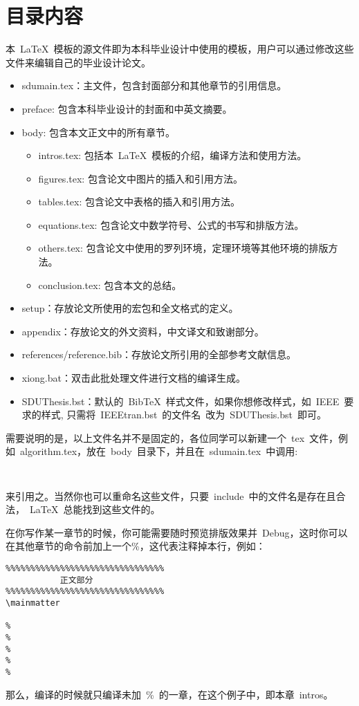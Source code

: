 \section{目录内容}
本~\LaTeX{}~模板的源文件即为本科毕业设计中使用的模板，用户可以通过修改这些文件来编辑自己的毕业设计论文。
\begin{itemize}
\item{sdumain.tex}：主文件，包含封面部分和其他章节的引用信息。
\item{preface}: 包含本科毕业设计的封面和中英文摘要。
\item{body}: 包含本文正文中的所有章节。
\begin{itemize}
\item{intros.tex}: 包括本~\LaTeX{}~模板的介绍，编译方法和使用方法。
\item{figures.tex}: 包含论文中图片的插入和引用方法。
\item{tables.tex}: 包含论文中表格的插入和引用方法。
\item{equations.tex}: 包含论文中数学符号、公式的书写和排版方法。
\item{others.tex}: 包含论文中使用的罗列环境，定理环境等其他环境的排版方法。
\item{conclusion.tex}: 包含本文的总结。
\end{itemize}
\item{setup}：存放论文所使用的宏包和全文格式的定义。
\item{appendix}：存放论文的外文资料，中文译文和致谢部分。
\item{references/reference.bib}：存放论文所引用的全部参考文献信息。
\item{xiong.bat}：双击此批处理文件进行文档的编译生成。

\item{SDUThesis.bst}：默认的~BibTeX~样式文件，如果你想修改样式，如~IEEE~要求的样式, 只需将~IEEEtran.bst~的文件名~改为~SDUThesis.bst~即可。
\end{itemize}
需要说明的是，以上文件名并不是固定的，各位同学可以新建一个~tex~文件，例如~algorithm.tex，放在~body~目录下，并且在~sdumain.tex~中调用:
\begin{verbatim}
    
\end{verbatim}
来引用之。当然你也可以重命名这些文件，只要~include~中的文件名是存在且合法，~\LaTeX~总能找到这些文件的。

在你写作某一章节的时候，你可能需要随时预览排版效果并~Debug，这时你可以在其他章节的\verb||命令前加上一个\%，这代表注释掉本行，例如：
\begin{verbatim}
%%%%%%%%%%%%%%%%%%%%%%%%%%%%%%%%
           正文部分
%%%%%%%%%%%%%%%%%%%%%%%%%%%%%%%%
\mainmatter

%
%
%
%
%
\end{verbatim}
那么，编译的时候就只编译未加~\%~的一章，在这个例子中，即本章~intros。

